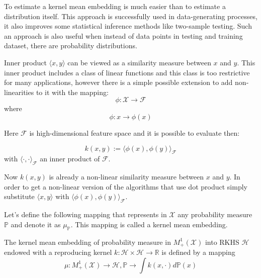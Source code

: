 To estimate a kernel mean embedding is much easier than to estimate a distribution itself. This approach is successfully used in data-generating processes, it also improves some statistical inference methods like two-sample testing. Such an approach is also useful when instead of data points in testing and training dataset, there are probability distributions. 

Inner product $\langle x, y \rangle$ can be viewed as a similarity measure between $x$ and $y$. This inner product includes a class of linear functions and this class is too restrictive for many applications, however there is a simple possible extension to add non-linearities to it with the mapping: \begin{equation}
    \phi: \mathcal{X} \rightarrow \mathcal{F}
\end{equation} where \begin{equation}
    \phi: x \rightarrow \phi(x)
    \label{equation:positive-definite}
\end{equation}

Here $\mathcal{F}$ is high-dimensional feature space and it is possible to evaluate then:

\begin{equation}
    k(x, y) := {\langle\phi(x), \phi(y)\rangle}_{\mathcal{F}}
\end{equation} with  ${\langle \cdot, \cdot \rangle}_{\mathcal{F}}$ an inner product of $\mathcal{F}$.

Now $ k(x, y)$ is already a non-linear similarity measure between $x$ and $y$. In order to get a non-linear version of the algorithms that use dot product simply substitute $\langle x, y\rangle$ with $ {\langle\phi(x), \phi(y)\rangle}_{\mathcal{F}}$. 

Let's define the following mapping that represents in $\mathcal{X}$ any probability measure $\mathds{P}$ and denote it as $\mu_{\mathds{P}}$. This mapping is called a kernel mean embedding.

\begin{definition}
    The kernel mean embedding of probability measure in $M^1_+(\mathcal{X})$ into RKHS $\mathscr{H}$ endowed with a reproducing kernel $k: \mathscr{H} \times \mathscr{H} \rightarrow \mathds{R}$ is defined by a mapping 
    \begin{equation}
        \mu : M^1_+(\mathcal{X}) \rightarrow \mathscr{H}, \mathds{P} \rightarrow \int k(x, \cdot)d\mathds{P}(x)
    \end{equation}
\end{definition}

